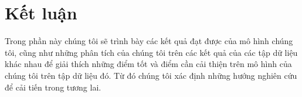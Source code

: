 \chapter{Kết luận}
\label{Chapter5}

Trong phần này chúng tôi sẽ trình bày các kết quả đạt được của mô hình chúng tôi, cũng như những phân tích của chúng tôi
trên các kết quả của các tập dữ liệu khác nhau để giải thích những điểm tốt và điểm cần cải thiện trên mô hình của chúng tôi trên tập dữ liệu đó. Từ đó chúng tôi xác định những hướng nghiên cứu để cải tiến trong tương lai.

